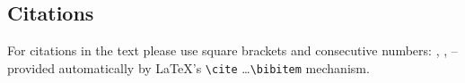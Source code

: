 \documentclass[runningheads,a4paper]{llncs}
\begin{document}
\subsection{Citations}

For citations in the text please use
square brackets and consecutive numbers: \cite{jour}, \cite{lncschap},
\cite{proceeding1} -- provided automatically
by \LaTeX 's \verb|\cite| \dots\verb|\bibitem| mechanism.


\end{document}
